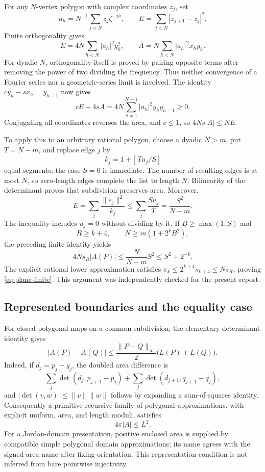 For any \(N\)-vertex polygon with complex coordinates \(z_j\), set
\[
 a_h=N^{-1}\sum_{j<N}z_j\zeta^{-jh},\qquad
 E=\sum_{j<N}|z_{j+1}-z_j|^2.
\]
Finite orthogonality gives
\[
 E=4N\sum_{h<N}|a_h|^2 y_h^2,
 \qquad A=N\sum_{h<N}|a_h|^2x_hy_h.
\]
For dyadic \(N\), orthogonality itself is proved by pairing opposite
terms after removing the power of two dividing the frequency.  Thus
neither convergence of a Fourier series nor a geometric-series limit
is involved.  The identity \(cy_h-sx_h=y_{h-1}\) now gives
\begin{equation}\label{eq:plane-dft-positive}
 cE-4sA=4N\sum_{h=1}^{N-1}|a_h|^2y_hy_{h-1}\ge0.
\end{equation}
Conjugating all coordinates reverses the area, and \(c\le1\), so
\(4Ns|A|\le NE\).

To apply this to an arbitrary rational polygon, choose a dyadic
\(N>m\), put \(T=N-m\), and replace edge \(j\) by
\[
 k_j=1+\left\lfloor Tu_j/S\right\rfloor
\]
equal segments; the case \(S=0\) is immediate.  The number of
resulting edges is at most \(N\), so zero-length edges complete the
list to length \(N\).  Bilinearity of the determinant proves that
subdivision preserves area.  Moreover,
\[
 E=\sum_j\frac{\lVert e_j\rVert^2}{k_j}
 \le\sum_j\frac{S u_j}{T}=\frac{S^2}{N-m}.
\]
The inequality includes \(u_j=0\) without dividing by it.
If \(B\ge\max(1,S)\) and
\[
 R\ge k+4,\qquad N\ge m(1+2^kB^2),
\]
the preceding finite identity yields
\[
 4Ns_R|A(P)|\le\frac{N}{N-m}S^2\le S^2+2^{-k}.
\]
The explicit rational lower approximation satisfies
\(\pi_k\le2^{k+4}s_{k+4}\le Ns_R\), proving
\eqref{eq:plane-finite}.  This argument was independently checked
for the present report.

\subsection{Represented boundaries and the equality case}
For closed polygonal maps on a common subdivision, the elementary
determinant identity gives
\begin{equation}\label{eq:plane-area-continuity}
 |A(P)-A(Q)|\le\frac{\|P-Q\|_\infty}{2}
                 \bigl(L(P)+L(Q)\bigr).
\end{equation}
Indeed, if \(d_j=p_j-q_j\), the doubled area difference is
\[
 \sum_j\det(d_j,p_{j+1}-p_j)
 +\sum_j\det(d_{j+1},q_{j+1}-q_j),
\]
and \(|\det(v,w)|\le\|v\|\|w\|\) follows by expanding a
sum-of-squares identity.  Consequently a primitive recursive family
of polygonal approximations, with explicit uniform, area, and length
moduli, satisfies
\[
                 4\pi |A|\le L^2.
\]
For a Jordan-domain presentation, positive enclosed area is supplied
by compatible simple polygonal domain approximations; its name agrees
with the signed-area name after fixing orientation.  This representation
condition is not inferred from bare pointwise injectivity.

